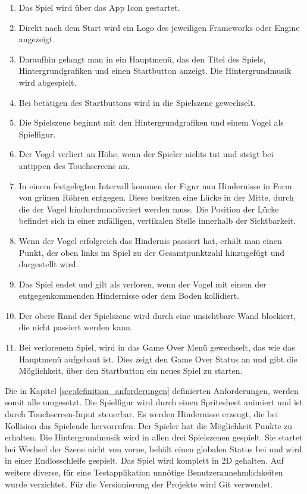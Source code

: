 \begin{enumerate}
	\item Das Spiel wird über das App Icon gestartet.
	\item Direkt nach dem Start wird ein Logo des jeweiligen Frameworks oder Engine angezeigt.
	\item Daraufhin gelangt man in ein Hauptmenü, das den Titel des Spiels, Hintergrundgrafiken und einen Startbutton anzeigt. Die Hintergrundmusik wird abgespielt.
	\item Bei betätigen des Startbuttons wird in die Spielszene gewechselt.
	\item Die Spielszene beginnt mit den Hintergrundgrafiken und einem Vogel als Spielfigur.
	\item Der Vogel verliert an Höhe, wenn der Spieler nichts tut und steigt bei antippen des Touchscreens an.
	\item In einem festgelegten Intervall kommen der Figur nun Hindernisse in Form von grünen Röhren entgegen. Diese besitzen eine Lücke in der Mitte, durch die der Vogel hindurchmanövriert werden muss. Die Position der Lücke befindet sich in einer zufälligen, vertikalen Stelle innerhalb der Sichtbarkeit.
	\item Wenn der Vogel erfolgreich das Hindernis passiert hat, erhält man einen Punkt, der oben links im Spiel zu der Gesamtpunktzahl hinzugefügt und dargestellt wird.
	\item Das Spiel endet und gilt als verloren, wenn der Vogel mit einem der entgegenkommenden Hindernisse oder dem Boden kollidiert.
	\item Der obere Rand der Spielszene wird durch eine unsichtbare Wand blockiert, die nicht passiert werden kann.
	\item Bei verlorenem Spiel, wird in das Game Over Menü gewechselt, das wie das Hauptmenü aufgebaut ist. Dies zeigt den Game Over Status an und gibt die Möglichkeit, über den Startbutton ein neues Spiel zu starten.
\end{enumerate}



Die in Kapitel \ref{sec:definition_anforderungen} definierten Anforderungen, werden somit alle umgesetzt. Die Spielfigur wird durch einen Spritesheet animiert und ist durch Touchscreen-Input steuerbar. Es werden Hindernisse erzeugt, die bei Kollision das Spielende hervorrufen. Der Spieler hat die Möglichkeit Punkte zu erhalten.
Die Hintergrundmusik wird in allen drei Spielszenen gespielt. Sie startet bei Wechsel der Szene nicht von vorne, behält einen globalen Status bei und wird in einer Endlosschleife gespielt. Das Spiel wird komplett in 2D gehalten. Auf weitere diverse, für eine Testapplikation unnötige Benutzerannehmlichkeiten wurde verzichtet. Für die Versionierung der Projekte wird Git verwendet.



